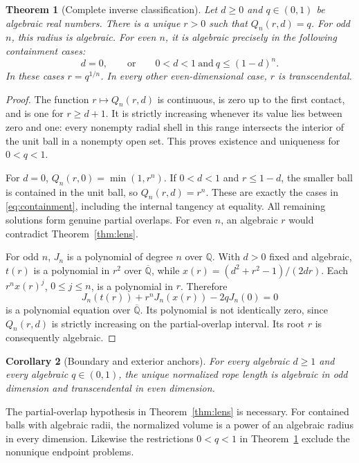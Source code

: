 \documentclass[11pt,a4paper]{article}
\numberwithin{equation}{section}
\newtheorem{theorem}{Theorem}[section]
\newtheorem{corollary}[theorem]{Corollary}
\theoremstyle{definition}
\theoremstyle{remark}
\newcommand{\Qbar}{\overline{\mathbb Q}}
\begin{document}
\begin{theorem}[Complete inverse classification]\label{thm:inverse}
Let $d\geq0$ and $q\in(0,1)$ be algebraic real numbers. There is a unique $r>0$ such that $Q_n(r,d)=q$. For odd $n$, this radius is algebraic. For even $n$, it is algebraic precisely in the following containment cases:
\begin{equation}\label{eq:containment}
 d=0,\qquad\text{or}\qquad 0<d<1\ \text{and}\ q\leq(1-d)^n.
\end{equation}
In these cases $r=q^{1/n}$. In every other even-dimensional case, $r$ is transcendental.
\end{theorem}
\begin{proof}
The function $r\mapsto Q_n(r,d)$ is continuous, is zero up to the first contact, and is one for $r\geq d+1$. It is strictly increasing whenever its value lies between zero and one: every nonempty radial shell in this range intersects the interior of the unit ball in a nonempty open set. This proves existence and uniqueness for $0<q<1$.

For $d=0$, $Q_n(r,0)=\min(1,r^n)$. If $0<d<1$ and $r\leq1-d$, the smaller ball is contained in the unit ball, so $Q_n(r,d)=r^n$. These are exactly the cases in \eqref{eq:containment}, including the internal tangency at equality. All remaining solutions form genuine partial overlaps. For even $n$, an algebraic $r$ would contradict Theorem~\ref{thm:lens}.

For odd $n$, $J_n$ is a polynomial of degree $n$ over $\mathbb Q$. With $d>0$ fixed and algebraic, $t(r)$ is a polynomial in $r^2$ over $\Qbar$, while $x(r)=(d^2+r^2-1)/(2dr)$. Each $r^n x(r)^j$, $0\leq j\leq n$, is a polynomial in $r$. Therefore
\[
 J_n(t(r))+r^nJ_n(x(r))-2qJ_n(0)=0
\]
is a polynomial equation over $\Qbar$. Its polynomial is not identically zero, since $Q_n(r,d)$ is strictly increasing on the partial-overlap interval. Its root $r$ is consequently algebraic.
\end{proof}

\begin{corollary}[Boundary and exterior anchors]\label{cor:boundary}
For every algebraic $d\geq1$ and every algebraic $q\in(0,1)$, the unique normalized rope length is algebraic in odd dimension and transcendental in even dimension.
\end{corollary}

The partial-overlap hypothesis in Theorem~\ref{thm:lens} is necessary. For contained balls with algebraic radii, the normalized volume is a power of an algebraic radius in every dimension. Likewise the restrictions $0<q<1$ in Theorem~\ref{thm:inverse} exclude the nonunique endpoint problems.
\end{document}
